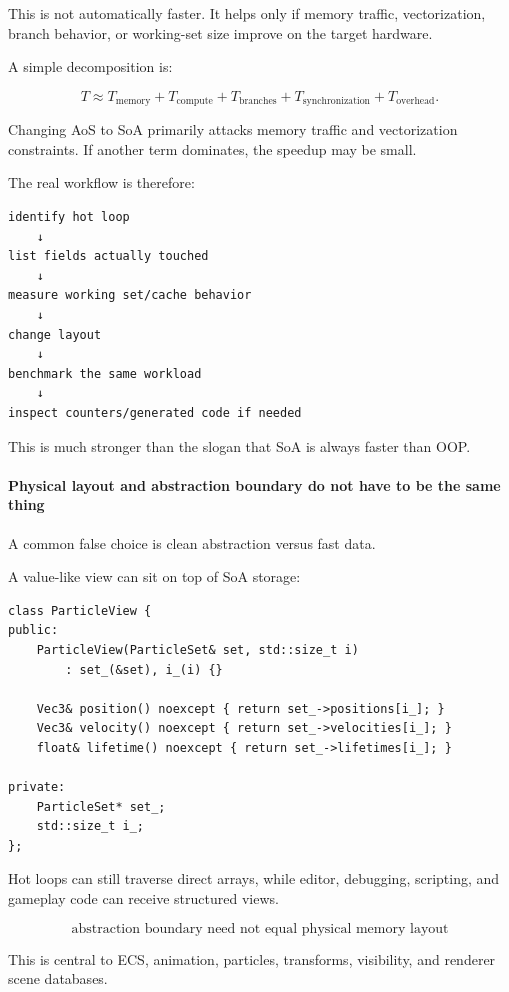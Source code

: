 This is not automatically faster. It helps only if memory traffic, vectorization, branch behavior, or working-set size improve on the target hardware.

A simple decomposition is:

\[
T
\approx
T_{\text{memory}}
+
T_{\text{compute}}
+
T_{\text{branches}}
+
T_{\text{synchronization}}
+
T_{\text{overhead}}.
\]

Changing AoS to SoA primarily attacks memory traffic and vectorization constraints. If another term dominates, the speedup may be small.

The real workflow is therefore:

\begin{verbatim}
identify hot loop
    ↓
list fields actually touched
    ↓
measure working set/cache behavior
    ↓
change layout
    ↓
benchmark the same workload
    ↓
inspect counters/generated code if needed
\end{verbatim}

This is much stronger than the slogan that SoA is always faster than OOP.

\paragraph{Physical layout and abstraction boundary do not have to be the same thing}\label{physical-layout-and-abstraction-boundary-do-not-have-to-be-the-same-thing}

A common false choice is clean abstraction versus fast data.

A value-like view can sit on top of SoA storage:

\begin{verbatim}
class ParticleView {
public:
    ParticleView(ParticleSet& set, std::size_t i)
        : set_(&set), i_(i) {}

    Vec3& position() noexcept { return set_->positions[i_]; }
    Vec3& velocity() noexcept { return set_->velocities[i_]; }
    float& lifetime() noexcept { return set_->lifetimes[i_]; }

private:
    ParticleSet* set_;
    std::size_t i_;
};
\end{verbatim}

Hot loops can still traverse direct arrays, while editor, debugging, scripting, and gameplay code can receive structured views.

\[
\boxed{
\text{abstraction boundary need not equal physical memory layout}
}
\]

This is central to ECS, animation, particles, transforms, visibility, and renderer scene databases.

